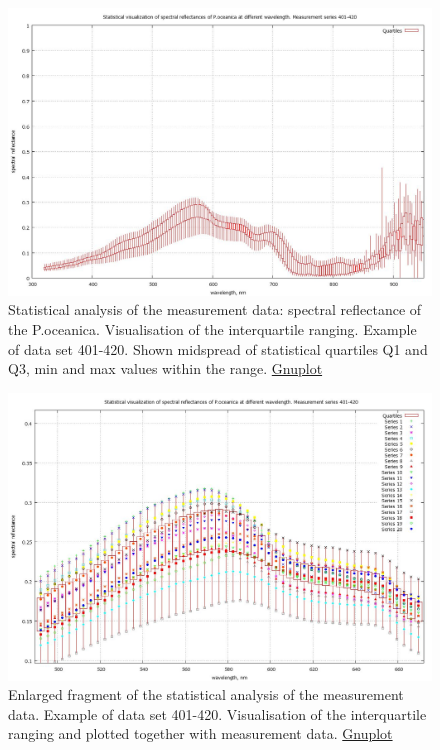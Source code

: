 \documentclass[10pt, a4paper]{article}
\begin{document}
\begin{appendices}
\begin{figure}[h]
	\begin{center}
		\includegraphics[scale=0.20]{GNU-401-420-candles.jpg}
		\caption{Statistical analysis of the measurement data: spectral reflectance of the P.oceanica. 
		Visualisation of the interquartile ranging. Example of data set 401-420. Shown midspread of  statistical quartiles Q1 and Q3, min and max values within the range. \href{http://www.gnuplot.info/}{Gnuplot}}
		\label{fig:44}
	\end{center}
\end{figure}
\begin{figure}[H]
	\begin{center}
		\includegraphics[scale=0.20]{GNU-enlarged-M-401-420.jpg}
		\caption{Enlarged fragment of the statistical analysis of the measurement data. Example of data set 401-420. 
		Visualisation of the interquartile ranging and plotted together with measurement data. \href{http://www.gnuplot.info/}{Gnuplot}}
		\label{fig:45}
	\end{center}
\end{figure}
\pagebreak


\end{appendices}
\end{document}

